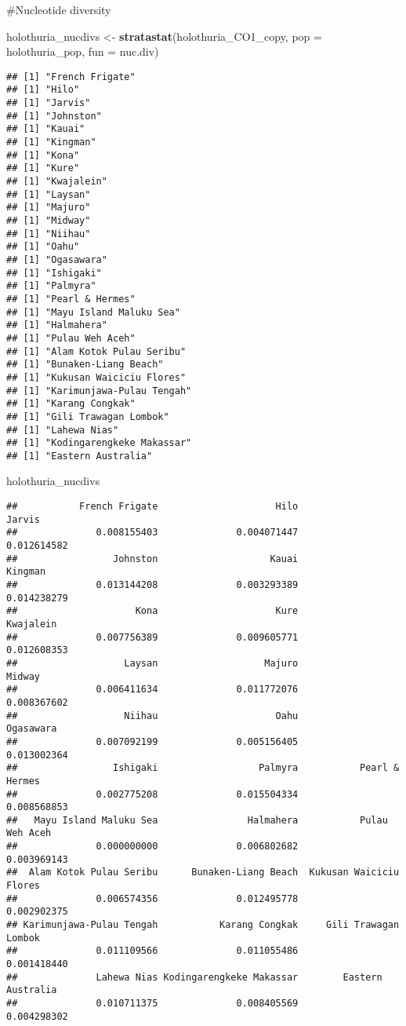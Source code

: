 \documentclass[
]{article}
\newenvironment{Shaded}{\begin{snugshade}}{\end{snugshade}}
\newcommand{\DataTypeTok}[1]{\textcolor[rgb]{0.13,0.29,0.53}{#1}}
\newcommand{\KeywordTok}[1]{\textcolor[rgb]{0.13,0.29,0.53}{\textbf{#1}}}
\newcommand{\NormalTok}[1]{#1}
\newcommand{\StringTok}[1]{\textcolor[rgb]{0.31,0.60,0.02}{#1}}
\begin{document}
\#Nucleotide diversity

\begin{Shaded}
\begin{Highlighting}[]
\NormalTok{holothuria_nucdivs <-}\StringTok{ }\KeywordTok{stratastat}\NormalTok{(holothuria_CO1_copy, }\DataTypeTok{pop =}\NormalTok{ holothuria_pop, }\DataTypeTok{fun =}\NormalTok{ nuc.div)}
\end{Highlighting}
\end{Shaded}

\begin{verbatim}
## [1] "French Frigate"
## [1] "Hilo"
## [1] "Jarvis"
## [1] "Johnston"
## [1] "Kauai"
## [1] "Kingman"
## [1] "Kona"
## [1] "Kure"
## [1] "Kwajalein"
## [1] "Laysan"
## [1] "Majuro"
## [1] "Midway"
## [1] "Niihau"
## [1] "Oahu"
## [1] "Ogasawara"
## [1] "Ishigaki"
## [1] "Palmyra"
## [1] "Pearl & Hermes"
## [1] "Mayu Island Maluku Sea"
## [1] "Halmahera"
## [1] "Pulau Weh Aceh"
## [1] "Alam Kotok Pulau Seribu"
## [1] "Bunaken-Liang Beach"
## [1] "Kukusan Waiciciu Flores"
## [1] "Karimunjawa-Pulau Tengah"
## [1] "Karang Congkak"
## [1] "Gili Trawagan Lombok"
## [1] "Lahewa Nias"
## [1] "Kodingarengkeke Makassar"
## [1] "Eastern Australia"
\end{verbatim}

\begin{Shaded}
\begin{Highlighting}[]
\NormalTok{holothuria_nucdivs}
\end{Highlighting}
\end{Shaded}

\begin{verbatim}
##           French Frigate                     Hilo                   Jarvis 
##              0.008155403              0.004071447              0.012614582 
##                 Johnston                    Kauai                  Kingman 
##              0.013144208              0.003293389              0.014238279 
##                     Kona                     Kure                Kwajalein 
##              0.007756389              0.009605771              0.012608353 
##                   Laysan                   Majuro                   Midway 
##              0.006411634              0.011772076              0.008367602 
##                   Niihau                     Oahu                Ogasawara 
##              0.007092199              0.005156405              0.013002364 
##                 Ishigaki                  Palmyra           Pearl & Hermes 
##              0.002775208              0.015504334              0.008568853 
##   Mayu Island Maluku Sea                Halmahera           Pulau Weh Aceh 
##              0.000000000              0.006802682              0.003969143 
##  Alam Kotok Pulau Seribu      Bunaken-Liang Beach  Kukusan Waiciciu Flores 
##              0.006574356              0.012495778              0.002902375 
## Karimunjawa-Pulau Tengah           Karang Congkak     Gili Trawagan Lombok 
##              0.011109566              0.011055486              0.001418440 
##              Lahewa Nias Kodingarengkeke Makassar        Eastern Australia 
##              0.010711375              0.008405569              0.004298302
\end{verbatim}
\end{document}
